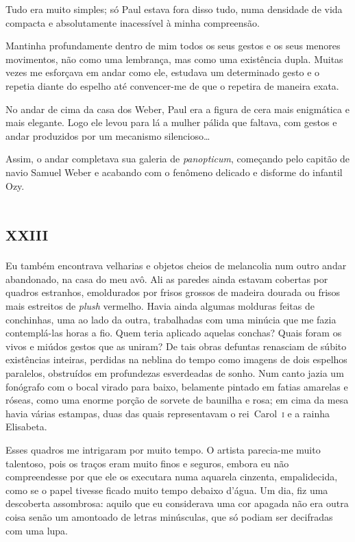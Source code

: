 Tudo era muito simples; só Paul estava fora disso tudo, numa densidade de vida compacta e absolutamente inacessível à minha compreensão.

Mantinha profundamente dentro de mim todos os seus gestos e os seus menores movimentos, não como uma lembrança, mas como uma existência dupla. Muitas vezes me esforçava em andar como ele, estudava um determinado gesto e o repetia diante do espelho até convencer-me de que o repetira de maneira exata.

No andar de cima da casa dos Weber, Paul era a figura de cera mais enigmática e mais elegante. Logo ele levou para lá a mulher pálida que faltava, com gestos e andar produzidos por um mecanismo silencioso\dots

Assim, o andar completava sua galeria de \textit{panopticum}, começando pelo capitão de navio Samuel Weber e acabando com o fenômeno delicado e disforme do infantil Ozy.


\chapter*{\huge\centering\textsc{xxiii}}

Eu também encontrava velharias e objetos cheios de melancolia num outro andar abandonado, na casa do meu avô. Ali as paredes ainda estavam cobertas por quadros estranhos, emoldurados por frisos grossos de madeira dourada ou frisos mais estreitos de \textit{plush} vermelho. Havia ainda algumas molduras feitas de conchinhas, uma ao lado da outra, trabalhadas com uma minúcia que me fazia contemplá-las horas a fio. Quem teria aplicado aquelas conchas? Quais foram os vivos e miúdos gestos que as uniram? De tais obras defuntas renasciam de súbito existências inteiras, perdidas na neblina do tempo como imagens de dois espelhos paralelos, obstruídos em profundezas esverdeadas de sonho.
Num canto jazia um fonógrafo com o bocal virado para baixo, belamente pintado em fatias amarelas e róseas, como uma enorme porção de sorvete de baunilha e rosa; em cima da mesa havia várias estampas, duas das quais representavam o rei~Carol~\textsc{i} e a rainha Elisabeta.

Esses quadros me intrigaram por muito tempo. O artista parecia-me muito talentoso, pois os traços eram muito finos e seguros, embora eu não compreendesse por que ele os executara numa aquarela cinzenta, empalidecida, como se o papel tivesse ficado muito tempo debaixo d'água.
Um dia, fiz uma descoberta assombrosa: aquilo que eu considerava uma cor apagada não era outra coisa senão um amontoado de letras minúsculas, que só podiam ser decifradas com uma lupa.

